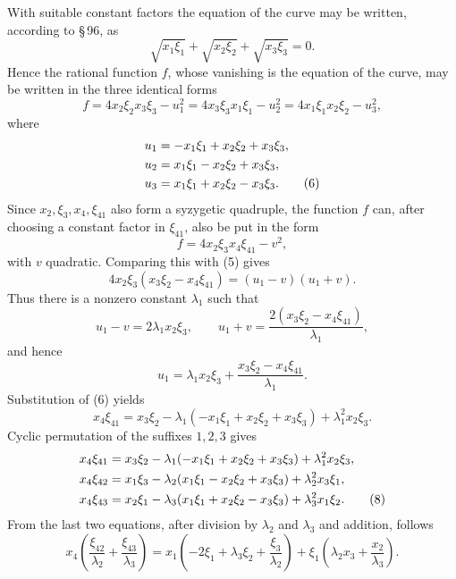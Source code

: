\documentclass[11pt]{article}
\begin{document}
With suitable constant factors the equation of the curve may be written, according to \S\,96, as
\begin{equation}
 \sqrt{x_1\xi_1}+\sqrt{x_2\xi_2}+\sqrt{x_3\xi_3}=0.
 \tag{4}
\end{equation}
Hence the rational function \(f\), whose vanishing is the equation of the curve, may be written in the three identical forms
\begin{equation}
 f=4x_2\xi_2x_3\xi_3-u_1^2
  =4x_3\xi_3x_1\xi_1-u_2^2
  =4x_1\xi_1x_2\xi_2-u_3^2,
 \tag{5}
\end{equation}
where
\begin{align}
 u_1&=-x_1\xi_1+x_2\xi_2+x_3\xi_3,\notag\\
 u_2&= x_1\xi_1-x_2\xi_2+x_3\xi_3,\notag\\
 u_3&= x_1\xi_1+x_2\xi_2-x_3\xi_3.
 \tag{6}
\end{align}
Since \(x_2,\xi_3,x_4,\xi_{41}\) also form a syzygetic quadruple, the function \(f\) can, after choosing a constant factor in \(\xi_{41}\), also be put in the form
\begin{equation}
 f=4x_2\xi_3x_4\xi_{41}-v^2,
 \tag{7}
\end{equation}
with \(v\) quadratic. Comparing this with (5) gives
\[
 4x_2\xi_3(x_3\xi_2-x_4\xi_{41})=(u_1-v)(u_1+v).
\]
Thus there is a nonzero constant \(\lambda_1\) such that
\[
 u_1-v=2\lambda_1x_2\xi_3,
 \qquad
 u_1+v=\frac{2(x_3\xi_2-x_4\xi_{41})}{\lambda_1},
\]
and hence
\[
 u_1=\lambda_1x_2\xi_3+\frac{x_3\xi_2-x_4\xi_{41}}{\lambda_1}.
\]
Substitution of (6) yields
\begin{equation}
 x_4\xi_{41}=x_3\xi_2-
 \lambda_1(-x_1\xi_1+x_2\xi_2+x_3\xi_3)+\lambda_1^2x_2\xi_3.
 \tag{8a}
\end{equation}
Cyclic permutation of the suffixes \(1,2,3\) gives
\begin{align}
 x_4\xi_{41}&=x_3\xi_2-
 \lambda_1(-x_1\xi_1+x_2\xi_2+x_3\xi_3)+\lambda_1^2x_2\xi_3,\notag\\
 x_4\xi_{42}&=x_1\xi_3-
 \lambda_2( x_1\xi_1-x_2\xi_2+x_3\xi_3)+\lambda_2^2x_3\xi_1,\notag\\
 x_4\xi_{43}&=x_2\xi_1-
 \lambda_3( x_1\xi_1+x_2\xi_2-x_3\xi_3)+\lambda_3^2x_1\xi_2.
 \tag{8}
\end{align}
From the last two equations, after division by \(\lambda_2\) and \(\lambda_3\) and addition, follows
\begin{equation}
 x_4\left(\frac{\xi_{42}}{\lambda_2}+\frac{\xi_{43}}{\lambda_3}\right)
 =x_1\left(-2\xi_1+\lambda_3\xi_2+\frac{\xi_3}{\lambda_2}\right)
 +\xi_1\left(\lambda_2x_3+\frac{x_2}{\lambda_3}\right).
 \tag{9}
\end{equation}
\end{document}
